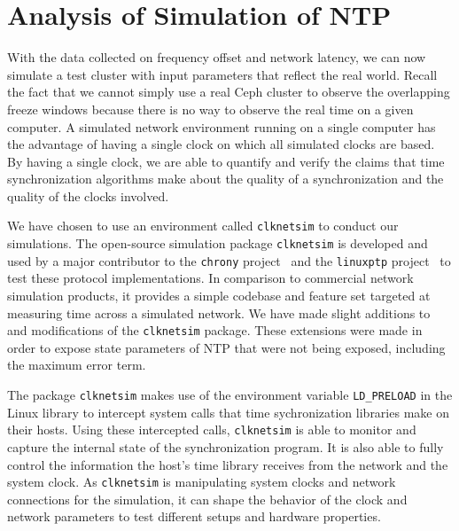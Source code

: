         



\section{Analysis of Simulation of NTP}

With the data collected on frequency offset and network latency, we can 
now simulate a test cluster with input parameters that reflect the 
real world. Recall the fact that we cannot simply use a real Ceph
cluster to observe the overlapping freeze windows because there is no
way to observe the real time on a given computer. A
simulated network environment running on a single computer has the
advantage of having a single clock on which all simulated clocks are
based. By having a single clock, we are able to quantify and verify
the claims that time synchronization algorithms make about the quality
of a synchronization and the quality of the clocks involved.

We have chosen to use an environment called \texttt{clknetsim} %
to conduct our simulations. The open-source simulation package 
\texttt{clknetsim} is 
developed and used by a major contributor to the \texttt{chrony}
project~\citep{chrony} and the \texttt{linuxptp} project~\citep{linuxptp}
to test these protocol implementations. In
comparison to commercial network simulation products, it provides a 
simple codebase and feature set targeted at measuring 
time across a simulated network. We have made slight additions to and
modifications of the \texttt{clknetsim} package. These extensions were made in 
order to expose state parameters of NTP that were not being exposed, 
including the maximum error term.

The package \texttt{clknetsim} makes use of the environment variable \texttt{LD\_PRELOAD} in
the Linux library to intercept system calls that time sychronization 
libraries make on their hosts. Using these intercepted calls, 
\texttt{clknetsim} is able to monitor and capture the internal state of
the synchronization program. It is also able to fully control the
information the host's time library receives from the network and the system
clock. As \texttt{clknetsim} is manipulating system clocks and network
connections for the simulation, it can shape the behavior of the clock
and network parameters to test different setups and hardware properties. 

